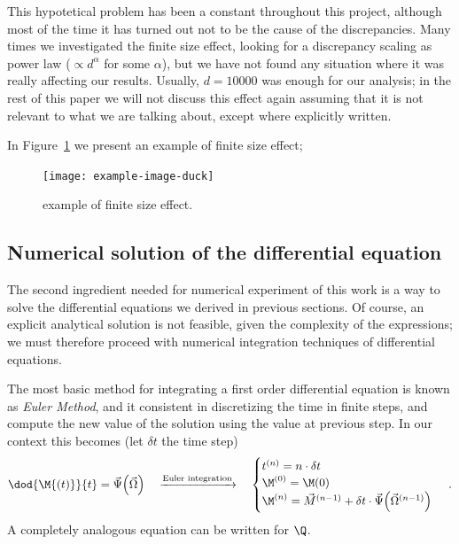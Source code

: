 This hypotetical problem has been a constant throughout this project,
although most of the time it has turned out not to be the cause of the discrepancies.
Many times we investigated the finite size effect, looking for a discrepancy scaling as
power law (\(\propto d^\alpha\) for some \(\alpha\)), but we have not found any situation where
it was really affecting our results. Usually, \(d=10000\) was enough for our analysis; 
in the rest of this paper we will not discuss this effect again assuming that
it is not relevant to what we are talking about, except where explicitly written.

In Figure~\ref{fig:finite_size_example} we present an example of finite size effect;
\begin{figure}
  \begin{center}
    \texttt{[image: example-image-duck]}

    \caption{
      example of finite size effect. 
    }
    \label{fig:finite_size_example}
  \end{center}
\end{figure}

\subsection{Numerical solution of the differential equation}
The second ingredient needed for numerical experiment of this work is a way to
solve the differential equations we derived in previous sections. Of course,
an explicit analytical solution is not feasible, given the complexity of the expressions;
we must therefore proceed with numerical integration techniques of differential equations. 

The most basic method for integrating a first order differential equation is known
as \emph{Euler Method}, and it consistent in discretizing the time in finite steps,
and compute the new value of the solution using the value at previous step.
In our context this becomes (let \(\delta t\) the time step)
\[
  \dod{\M{\left(t\right)}}{t} = \vec{\Psi}{\left(\vec{\Omega}\right)}
  \quad\xrightarrow{\text{Euler integration}}\quad
  \begin{cases}
    t^{(n)} = n \cdot \delta t \\
    \M^{(0)} = \M(0) \\
    \M^{(n)} = \vec{M}^{(n-1)} + \delta t\cdot\vec{\Psi}{\left(\vec{\Omega}^{(n-1)}\right)}
  \end{cases}\,.
\]
A completely analogous equation can be written for \(\Q\).


